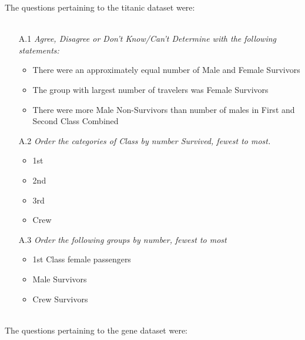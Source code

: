 \noindent The questions pertaining to the titanic dataset were: \\ \\
\begin{itemize}
\item[A.1]\emph{Agree, Disagree or Don't Know/Can't Determine with the following statements:}
\begin{itemize}
\item There were an approximately equal number of Male and Female Survivors
\item The group with largest number of travelers was Female Survivors
\item There were more Male Non-Survivors than number of males in First and Second Class Combined
\end{itemize}

\item[A.2]\emph{Order the categories of Class by number Survived, fewest to most.} 
\begin{itemize}
\item 1st
\item 2nd 
\item 3rd
\item Crew
\end{itemize}

\item[A.3]\emph{Order the following groups by number, fewest to most}
\begin{itemize}
\item 1st Class female passengers
\item Male Survivors
\item Crew Survivors
\end{itemize}
\end{itemize}


\noindent \\  The questions pertaining to the gene dataset were: 



